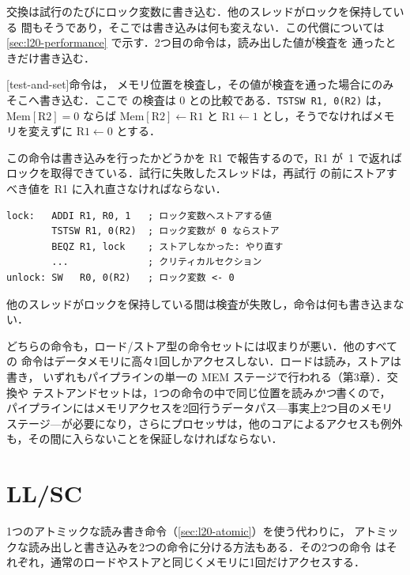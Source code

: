 \documentclass[../main.tex]{subfiles}
\begin{document}
交換は試行のたびにロック変数に書き込む．他のスレッドがロックを保持している
間もそうであり，そこでは書き込みは何も変えない．この代償については
\cref{sec:l20-performance} で示す．2つ目の命令は，読み出した値が検査を
通ったときだけ書き込む．

\begin{definition}[テストアンドセット]
  [test-and-set]命令は，
  メモリ位置を検査し，その値が検査を通った場合にのみそこへ書き込む．ここで
  の検査は 0 との比較である．\texttt{TSTSW R1, 0(R2)} は，
  $\text{Mem}[\text{R2}] = 0$ ならば
  $\text{Mem}[\text{R2}] \leftarrow \text{R1}$ と
  $\text{R1} \leftarrow 1$ とし，そうでなければメモリを変えずに
  $\text{R1} \leftarrow 0$ とする．
\end{definition}

この命令は書き込みを行ったかどうかを R1 で報告するので，R1 が~1 で返れば
ロックを取得できている．試行に失敗したスレッドは，再試行
の前にストアすべき値を R1 に入れ直さなければならない．
\begin{lstlisting}[language={[x86masm]Assembler}, numbers=none, deletekeywords={lock}]
lock:   ADDI R1, R0, 1   ; ロック変数へストアする値
        TSTSW R1, 0(R2)  ; ロック変数が 0 ならストア
        BEQZ R1, lock    ; ストアしなかった: やり直す
        ...              ; クリティカルセクション
unlock: SW   R0, 0(R2)   ; ロック変数 <- 0
\end{lstlisting}
他のスレッドがロックを保持している間は検査が失敗し，命令は何も書き込まない．

どちらの命令も，ロード/ストア型の命令セットには収まりが悪い．他のすべての
命令はデータメモリに高々1回しかアクセスしない．ロードは読み，ストアは書き，
いずれもパイプラインの単一の MEM ステージで行われる（第3章）．交換や
テストアンドセットは，1つの命令の中で同じ位置を読み\emph{かつ}書くので，
パイプラインにはメモリアクセスを2回行うデータパス---事実上2つ目のメモリ
ステージ---が必要になり，さらにプロセッサは，他のコアによるアクセスも例外
も，その間に入らないことを保証しなければならない．

\section{LL/SC}
\label{sec:l20-llsc}

1つのアトミックな読み書き命令（\cref{sec:l20-atomic}）を使う代わりに，
アトミックな読み出しと書き込みを2つの命令に分ける方法もある．その2つの命令
はそれぞれ，通常のロードやストアと同じくメモリに1回だけアクセスする．
\end{document}

